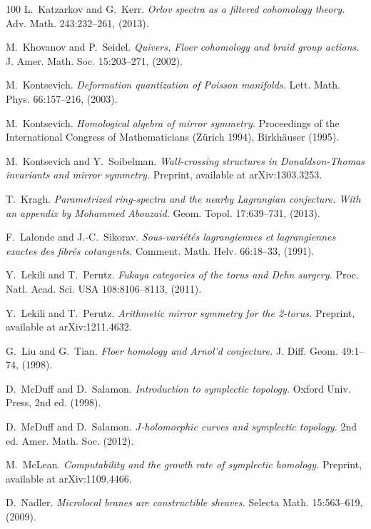 \begin{thebibliography}{100}
L.~Katzarkov and G.~Kerr.
\emph{Orlov spectra as a filtered cohomology theory.}
Adv. Math. 243:232--261, (2013).

M.~Khovanov and P.~Seidel.
\emph{Quivers, Floer cohomology and braid group actions.}
J. Amer. Math. Soc. 15:203--271, (2002).

M.~Kontsevich.
\emph{Deformation quantization of Poisson manifolds.}
Lett. Math. Phys. 66:157--216, (2003).

M.~Kontsevich.
\emph{Homological algebra of mirror symmetry.}
Proceedings of the International Congress of Mathematicians (Z\"urich 1994), Birkh\"auser (1995).

M.~Kontsevich and Y.~Soibelman.
\emph{Wall-crossing structures in Donaldson-Thomas invariants and mirror symmetry.}
Preprint, available at arXiv:1303.3253.

T.~Kragh.
\emph{Parametrized ring-spectra and the nearby Lagrangian conjecture. With an appendix by Mohammed Abouzaid.}
Geom. Topol. 17:639--731, (2013).

F.~Lalonde and J.-C.~Sikorav.
\emph{Sous-vari\'et\'es lagrangiennes et lagrangiennes exactes des fibr\'es cotangents.}
Comment. Math. Helv. 66:18--33, (1991).

Y.~Lekili and T.~Perutz.
\emph{Fukaya categories of the torus and Dehn surgery.}
Proc. Natl. Acad. Sci. USA 108:8106--8113, (2011).

Y.~Lekili and T.~Perutz.
\emph{Arithmetic mirror symmetry for the 2-torus.}
Preprint, available at arXiv:1211.4632.

G.~Liu and G.~Tian.
\emph{Floer homology and Arnol'd conjecture.}
J. Diff. Geom. 49:1--74, (1998).

D.~McDuff and D.~Salamon.
\emph{Introduction to symplectic topology.}
Oxford Univ. Press, 2nd ed. (1998).

D.~McDuff and D.~Salamon.
\emph{$J$-holomorphic curves and symplectic topology.} 2nd ed.
Amer. Math. Soc. (2012).

M.~McLean.
\emph{Computability and the growth rate of symplectic homology.}
Preprint, available at arXiv:1109.4466.

D.~Nadler.
\emph{Microlocal branes are constructible sheaves.}
Selecta Math. 15:563--619, (2009).


\end{thebibliography}
